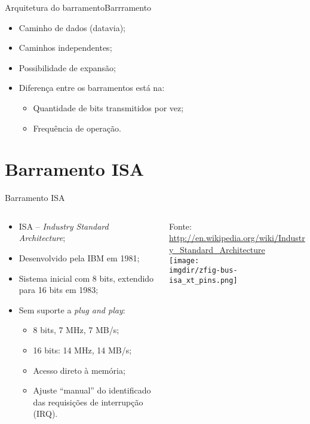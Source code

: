 \begin{frame}{Arquitetura do barramento}{Barrramento}
  \begin{itemize}
  \item Caminho de dados (datavia);
    \item Caminhos independentes;
    \item Possibilidade de expansão;
    \item Diferença entre os barramentos está na:
      \begin{itemize}
      \item Quantidade de bits transmitidos por vez;
      \item Frequência de operação.
      \end{itemize}
  \end{itemize}
  
  
\end{frame}


\busslide

\def\thetitle{Barramento ISA}
\section{\thetitle}
\begin{frame}{\thetitle}
  \begin{columns}
    \begin{column}{.575\textwidth}
      \footnotesize
      \begin{itemize}
      \item ISA -- {\em Industry Standard Architecture};
      \item Desenvolvido pela IBM em 1981;
      \item Sistema inicial com 8 bits, extendido para 16 bits em 1983;
      \item Sem suporte a {\em plug and play}: 
         \begin{itemize}
           \item 8 bits, 7 MHz, 7 MB/s;
             \item 16 bits: 14 MHz, 14 MB/s;
         \item Acesso direto à memória;
        \item Ajuste ``manual'' do identificado das requisições de
          interrupção (IRQ).
        \end{itemize}
      \end{itemize}
    \end{column}
    \begin{column}{.475\textwidth}
      \begin{center}
        {\tiny Fonte: \url{http://en.wikipedia.org/wiki/Industry_Standard_Architecture}}\\
        \texttt{[image: \\imgdir/zfig-bus-isa\_xt\_pins.png]}
      \end{center}  
    \end{column}
  \end{columns}
\end{frame}

